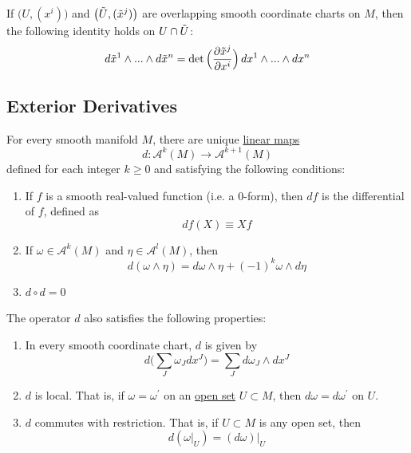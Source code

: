 \documentclass{article}
\newcounter{theorem}[section]
\begin{document}
    \begin{corollary}
      \label{thm:change-of-coordinates-for-a-top-degree-form}
    If $\big(U, (x^i)\big)$ and $\big(\Tilde{U}, (\Tilde{x}^j)\big)$ are overlapping smooth coordinate charts on $M$, then the following identity holds on $U \cap \Tilde{U}$:
    \begin{equation}
      d\Tilde{x}^1 \wedge ... \wedge d\Tilde{x}^n = \det \Big( \frac{\partial \Tilde{x}^j}{\partial x^i}\Big)\, dx^1 \wedge ... \wedge dx^n
    \end{equation}
    \end{corollary}

  \subsection{Exterior Derivatives}

    \begin{theorem}
      \label{thm:the-exterior-derivative}
    For every smooth manifold $M$, there are unique \hyperref[lin-def:linear_map]{linear maps}
    \begin{equation}
      d: \mathcal{A}^k (M) \to \mathcal{A}^{k+1} (M)
    \end{equation}
    defined for each integer $k \geq 0$ and satisfying the following conditions: 
    \begin{enumerate}
        \item If $f$ is a smooth real-valued function (i.e. a $0$-form), then $df$ is the differential of $f$, defined as 
        \begin{equation}
          df(X) \equiv X f
        \end{equation}
        \item If $\omega \in \mathcal{A}^k (M)$ and $\eta \in \mathcal{A}^l (M)$, then 
        \begin{equation}
          d (\omega \wedge \eta) = d \omega \wedge \eta + (-1)^k \omega \wedge d\eta
        \end{equation}
        \item $d \circ d = 0$
    \end{enumerate}
    The operator $d$ also satisfies the following properties: 
    \begin{enumerate}
        \item In every smooth coordinate chart, $d$ is given by 
        \begin{equation}
          d \bigg( \sum_J \omega_J dx^J \bigg) = \sum_J d\omega_J \wedge d x^J
        \end{equation}
        \item $d$ is local. That is, if $\omega = \omega^\prime$ on an \hyperref[pst-def:open-set]{open set} $U \subset M$, then $d\omega = d\omega^\prime$ on $U$. 
        \item $d$ commutes with restriction. That is, if $U \subset M$ is any open set, then 
        \begin{equation}
          d (\omega|_U) = (d \omega) \big|_U
        \end{equation}
    \end{enumerate}
    \end{theorem}
\end{document}

